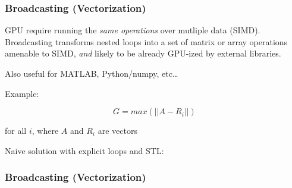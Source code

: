 \subsubsection{Broadcasting
(Vectorization)}\label{broadcasting-vectorization}

GPU require running the \emph{same operations} over mutliple data
(SIMD). Broadcasting transforms nested loops into a set of matrix or
array operations amenable to SIMD, \emph{and} likely to be already
GPU-ized by external libraries.

Also useful for MATLAB, Python/numpy, etc\ldots{}

Example:

\[G = max(||A - R_i||)\]

for all $i$, where $A$ and $R_i$ are vectors

Naive solution with explicit loops and STL:

\begin{Shaded}
\begin{Highlighting}[]

 \NormalTok{, }\NormalTok{>> } 
             \NormalTok{, }\NormalTok{> } 
   \NormalTok{);}
  \NormalTok{(}  
     \NormalTok{norm = (A[}\NormalTok{] - R[}\NormalTok{]) * (A[}\NormalTok{] - R[}\NormalTok{]) + (A[}\NormalTok{] - R[}\NormalTok{]) * (A[}\NormalTok{] - R[}\NormalTok{])}
                \NormalTok{+ (A[}\NormalTok{] - R[}\NormalTok{]) * (A[}\NormalTok{] - R[}\NormalTok{]);}
  \NormalTok{\}}
   
\NormalTok{\}}
\end{Highlighting}
\end{Shaded}

\subsubsection{Broadcasting
(Vectorization)}\label{broadcasting-vectorization-1}

